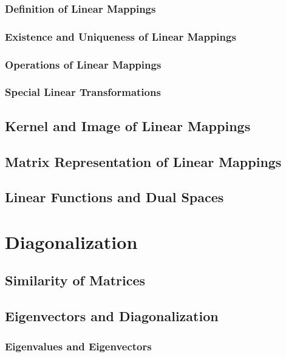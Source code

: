 \documentclass[11pt]{elegantbook}
\begin{document}
\subsection{Definition of Linear Mappings}

\subsection{Existence and Uniqueness of Linear Mappings}

\subsection{Operations of Linear Mappings}

\subsection{Special Linear Transformations}

\section{Kernel and Image of Linear Mappings}

\section{Matrix Representation of Linear Mappings}

\section{Linear Functions and Dual Spaces }



\chapter{Diagonalization}
\section{Similarity of Matrices}
\section{Eigenvectors and Diagonalization}
\subsection{Eigenvalues and Eigenvectors}
\end{document}
